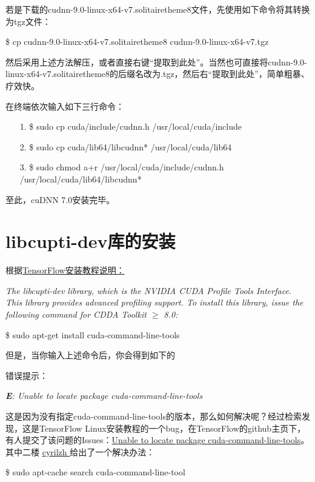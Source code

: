 \documentclass[11pt,a4paper]{ctexart}
\begin{document}
若是下载的cudnn-9.0-linux-x64-v7.solitairetheme8文件，先使用如下命令将其转换为tgz文件：
\vspace{-0.2cm}
\begin{center}
\$ cp cudnn-9.0-linux-x64-v7.solitairetheme8  cudnn-9.0-linux-x64-v7.tgz
\end{center}
然后采用上述方法解压，或者直接右键“提取到此处”。当然也可直接将cudnn-9.0-linux-x64-v7.{\color{red}solitairetheme8}的后缀名改为.{\color{red}tgz}，然后右“提取到此处”，简单粗暴、疗效快。

在终端依次输入如下三行命令：
\vspace{-0.2cm}
\begin{itemize}
\item[1.] \$ sudo cp cuda/include/cudnn.h  /usr/local/cuda/include
\item[2.] \$ sudo cp cuda/lib64/libcudnn*  /usr/local/cuda/lib64
\item[3.] \$ sudo chmod a+r /usr/local/cuda/include/cudnn.h /usr/local/cuda/lib64/libcudnn*
\end{itemize}

至此，cuDNN 7.0安装完毕。



\section{libcupti-dev库的安装}
根据\href{https://www.tensorflow.org/install/install_linux}{TensorFlow安装教程说明：}

\emph{The libcupti-dev library, which is the NVIDIA CUDA Profile Tools Interface. This library provides advanced profiling support. To install this library, issue the following command for CDDA Toolkit $\ge$ 8.0:}
\begin{center}
\$ sudo apt-get install cuda-command-line-tools
\end{center}

但是，当你输入上述命令后，你会得到如下的 {  \color{red} {\heiti 错误提示}：
\begin{center}
\emph{
\textbf E: Unable to locate package cuda-command-line-tools
}
\end{center}
}
这是因为{\heiti 没有指定cuda-command-line-tools的版本}，那么如何解决呢？经过检索发现，{\color{red}这是TensorFlow Linux安装教程的一个bug}，在TensorFlow的github主页下，有人提交了该问题的Issues：\href{https://github.com/tensorflow/tensorflow/issues/16214}{Unable to locate package cuda-command-line-tools}。其中二楼 \href{https://github.com/cyrilzh}{ cyrilzh }给出了一个解决办法：
\begin{center}
\$ sudo apt-cache search cuda-command-line-tool
\end{center}
\end{document}
